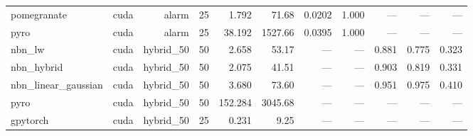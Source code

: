 \begin{table}[h]
\begin{tabular}{lrrrrrrrrrr}
    pomegranate & cuda & alarm & 25 & 1.792 & 71.68 & 0.0202 & 1.000 & — & — & — \\
    pyro & cuda & alarm & 25 & 38.192 & 1527.66 & 0.0395 & 1.000 & — & — & — \\
    nbn\_lw & cuda & hybrid\_50 & 50 & 2.658 & 53.17 & — & — & 0.881 & 0.775 & 0.323 \\
    nbn\_hybrid & cuda & hybrid\_50 & 50 & 2.075 & 41.51 & — & — & 0.903 & 0.819 & 0.331 \\
    nbn\_linear\_gaussian & cuda & hybrid\_50 & 50 & 3.680 & 73.60 & — & — & 0.951 & 0.975 & 0.410 \\
    pyro & cuda & hybrid\_50 & 50 & 152.284 & 3045.68 & — & — & — & — & — \\
    gpytorch & cuda & hybrid\_50 & 25 & 0.231 & 9.25 & — & — & — & — & — \\
    \bottomrule
  \end{tabular}
\end{table}
